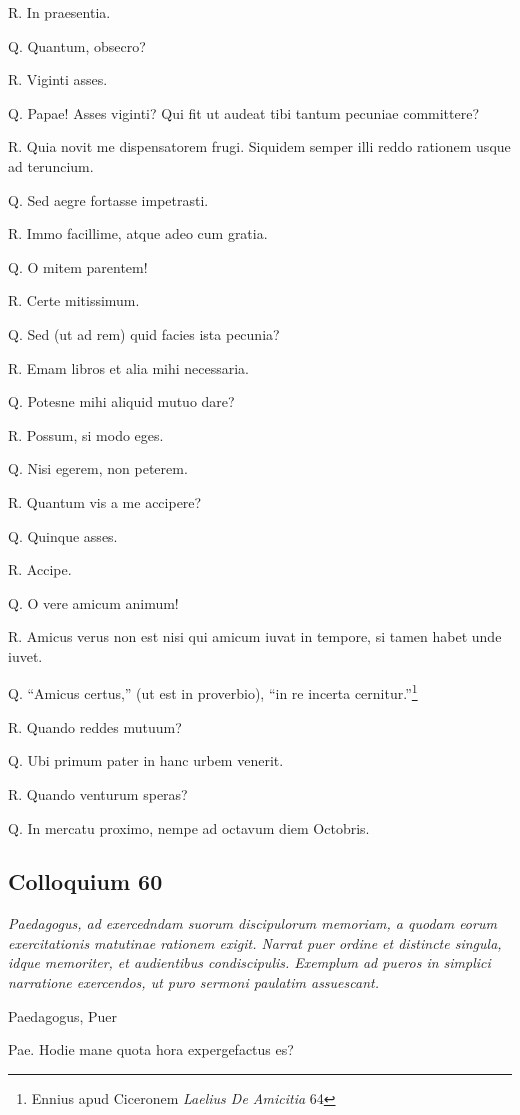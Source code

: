 \documentclass{article}
\begin{document}
R. In praesentia. 

Q. Quantum, obsecro?

R. Viginti asses. 

Q. Papae! Asses viginti? Qui fit ut audeat tibi tantum pecuniae committere?

R. Quia novit me dispensatorem frugi. Siquidem semper illi reddo rationem usque ad teruncium. 

Q. Sed aegre fortasse impetrasti. 

R. Immo facillime, atque adeo cum gratia. 

Q. O mitem parentem!

R. Certe mitissimum. 

Q. Sed (ut ad rem) quid facies ista pecunia?

R. Emam libros et alia mihi necessaria. 

Q. Potesne mihi aliquid mutuo dare?

R. Possum, si modo eges. 

Q. Nisi egerem, non peterem. 

R. Quantum vis a me accipere?

Q. Quinque asses. 

R. Accipe. 

Q. O vere amicum animum!

R. Amicus verus non est nisi qui amicum iuvat in tempore, si tamen habet unde iuvet. 

Q. ``Amicus certus,'' (ut est in proverbio), ``in re incerta cernitur.''\footnote{Ennius apud Ciceronem \emph{Laelius De Amicitia} 64}

R. Quando reddes mutuum?

Q. Ubi primum pater in hanc urbem venerit. 

R. Quando venturum speras?

Q. In mercatu proximo, nempe ad octavum diem Octobris.

\subsection{Colloquium 60}
\emph{Paedagogus, ad exercedndam suorum discipulorum memoriam, a quodam eorum exercitationis matutinae rationem exigit. Narrat puer ordine et distincte singula, idque memoriter, et audientibus condiscipulis. Exemplum ad pueros in simplici narratione exercendos, ut puro sermoni paulatim assuescant.}

Paedagogus, Puer

Pae. Hodie mane quota hora expergefactus es?
\end{document}
